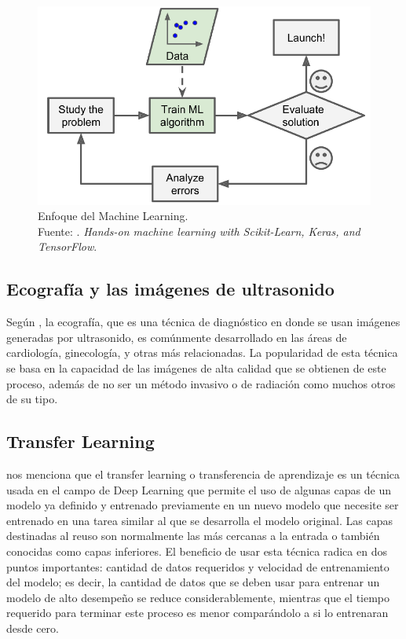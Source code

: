 \begin{figure}[H]
	\begin{center}
		\includegraphics[width=1.00\textwidth]{2/figures/enfoque_ml.png}
		\caption[Enfoque del Machine Learning]{Enfoque del Machine Learning. \\
		Fuente: \cite{bk_geron2022handml}. \textit{Hands-on machine learning with Scikit-Learn, Keras, and TensorFlow}.}
		\label{2:fig209}
	\end{center}
\end{figure}

\subsection{Ecografía y las imágenes de ultrasonido}
Según \cite{pr_herrera2017diseimp}, la ecografía, que es una técnica de diagnóstico en donde se usan imágenes generadas por ultrasonido, es comúnmente desarrollado en las áreas de cardiología, ginecología, y otras más relacionadas. La popularidad de esta técnica se basa en la capacidad de las imágenes de alta calidad que se obtienen de este proceso, además de no ser un método invasivo o de radiación como muchos otros de su tipo.

\subsection{Transfer Learning}
\cite{bk_geron2022handml} nos menciona que el transfer learning o transferencia de aprendizaje es un técnica usada en el campo de Deep Learning que permite el uso de algunas capas de un modelo ya definido y entrenado previamente en un nuevo modelo que necesite ser entrenado en una tarea similar al que se desarrolla el modelo original. Las capas destinadas al reuso son normalmente las más cercanas a la entrada o también conocidas como capas inferiores. El beneficio de usar esta técnica radica en dos puntos importantes: cantidad de datos requeridos y velocidad de entrenamiento del modelo; es decir, la cantidad de datos que se deben usar para entrenar un modelo de alto desempeño se reduce considerablemente, mientras que el tiempo requerido para terminar este proceso es menor comparándolo a si lo entrenaran desde cero.

